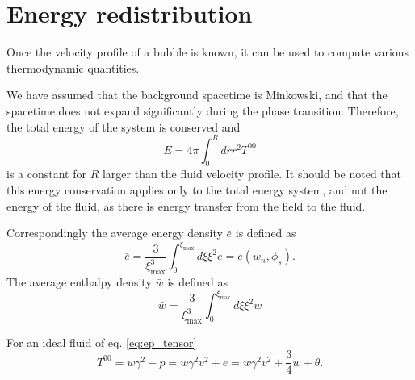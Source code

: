 \section{Energy redistribution}
\label{energy_redistribution}
Once the velocity profile of a bubble is known, it can be used to compute various thermodynamic quantities.

We have assumed that the background spacetime is Minkowski, and that the spacetime does not expand significantly during the phase transition.
Therefore, the total energy of the system is conserved and
\begin{equation}
E = 4 \pi \int_0^R dr r^2 T^{00}
\end{equation}
is a constant for $R$ larger than the fluid velocity profile.
It should be noted that this energy conservation applies only to the total energy system,
and not the energy of the fluid, as there is energy transfer from the field to the fluid.
\cite[p. 21]{lecture_notes}

Correspondingly the average energy density $\bar{e}$ is defined as \cite[p. 39]{lecture_notes}
\begin{equation}
\bar{e} = \frac{3}{\xi_\text{max}^3} \int_0^{\xi_\text{max}} d\xi \xi^2 e = e(w_n, \phi_s).
\label{eq:e_conservation}
\end{equation}
The average enthalpy density $\bar{w}$ is defined as
\begin{equation}
\bar{w} = \frac{3}{\xi_\text{max}^3} \int_0^{\xi_\text{max}} d\xi \xi^2 w
\label{eq:wbar}
\end{equation}

For an ideal fluid of eq. \eqref{eq:ep_tensor} \cite[eq. B.23]{hindmarsh_gw_pt_2019}
\begin{equation}
T^{00} = w\gamma^2 - p = w\gamma^2 v^2 + e = w\gamma^2 v^2 + \frac{3}{4}w + \theta.
\end{equation}

